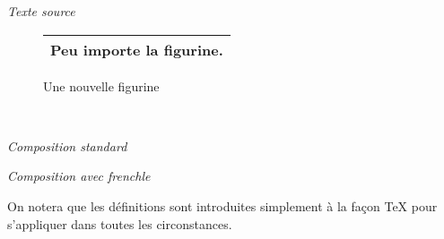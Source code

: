 \documentclass[a4paper,12pt,openright]{article}
\begin{document}
\noindent
\begin{minipage}{\textwidth}
\begin{center} %
\textit{Texte source}\\[.5ex]
{\large
\begin{boxedverbatim}
\fraddto{}
\begin{figure}
  \begin{tabular}{|c|}
    \hline
    \centerline{Peu importe la figurine.}\\
    \hline
\end{tabular}
\caption{Une nouvelle figurine}
\end{figure}
\end{boxedverbatim}
}\\[.5em]
\end{center}
\end{minipage}
\begin{center}
\setcounter{mpfootnote}{1} %
\renewcommand{\thempfootnote}{\arabic{mpfootnote}}
\parbox{60mm}{
\begin{center}
\textit{Composition standard}
%
\end{center}
}%
\parbox{65mm}{
\begin{center}
\textit{Composition avec frenchle}
\end{center}
}
%
\end{center} %

On notera que les définitions sont introduites simplement à la façon \TeX{} pour
s’appliquer dans toutes les circonstances.
\end{document}

